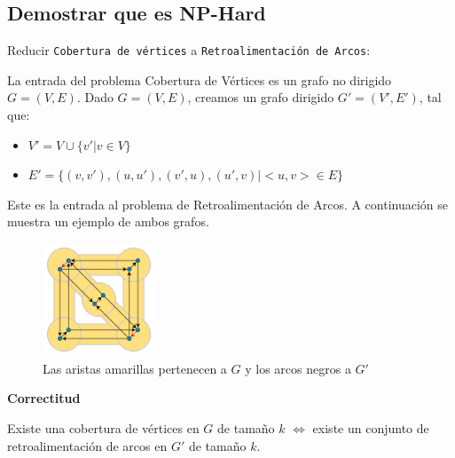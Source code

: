 \documentclass{article}
\begin{document}
\subsection{Demostrar que es NP-Hard}
Reducir \texttt{Cobertura de vértices} a \texttt{Retroalimentación de Arcos}:

La entrada del problema Cobertura de Vértices es un grafo no dirigido $G=(V,E)$. Dado $G=(V,E)$, creamos un grafo dirigido $G'=(V',E')$, tal que:
\begin{itemize}
    \item \(V' = V \cup \{ v' | v \in V\}\)
    \item \(E' = \{ (v,v'),(u,u'), (v',u),(u',v) | <u,v> \in E\}\)
\end{itemize}
Este es la entrada al problema de Retroalimentación de Arcos. A continuación se muestra un ejemplo de ambos grafos.

\begin{figure}[h]
    \centering
    \includegraphics[width=0.3\textwidth]{images/Feedback_arc_set.png}
    \caption{Las aristas amarillas pertenecen a \(G\) y los arcos negros a \(G'\)}
    \label{fig:foto_carpeta}
\end{figure}

\textbf{Correctitud}

Existe una cobertura de vértices en \( G \) de tamaño \(k\) \(\iff\) existe un conjunto de retroalimentación de arcos en \( G' \) de tamaño \(k\).
\end{document}
